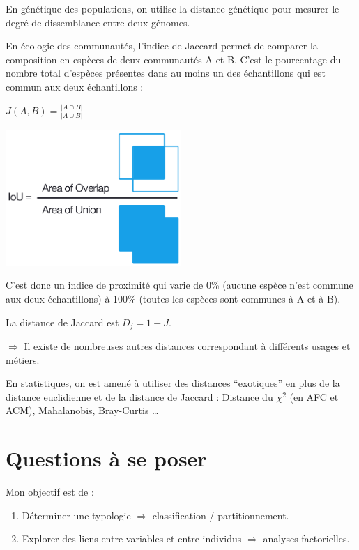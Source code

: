 \documentclass[]{book}
\providecommand{\tightlist}{%
  \setlength{\itemsep}{0pt}\setlength{\parskip}{0pt}}
\begin{document}
En génétique des populations, on utilise la distance génétique pour mesurer le degré de dissemblance entre deux génomes.

En écologie des communautés, l'indice de Jaccard permet de comparer la composition en espèces de deux communautés A et B. C'est le pourcentage du nombre total d'espèces présentes dans au moins un des échantillons qui est commun aux deux échantillons :

\(J(A,B) = \frac{|A \cap B|}{|A \cup B|}\)

\includegraphics[width=0.5\textwidth,height=\textheight]{images/jaccard.png}

C'est donc un indice de proximité qui varie de 0\% (aucune espèce n'est commune aux deux échantillons) à 100\% (toutes les espèces sont communes à A et à B).

La distance de Jaccard est \(D_j = 1 - J\).

\(\Rightarrow\) Il existe de nombreuses autres distances correspondant à différents usages et métiers.

En statistiques, on est amené à utiliser des distances ``exotiques'' en plus de la distance euclidienne et de la distance de Jaccard : Distance du \({\chi}^2\) (en AFC et ACM), Mahalanobis, Bray-Curtis \ldots{}

\hypertarget{questions-a-se-poser}{%
\section{Questions à se poser}\label{questions-a-se-poser}}

Mon objectif est de :

\begin{enumerate}
\def\labelenumi{\arabic{enumi}.}
\tightlist
\item
  Déterminer une typologie \(\Rightarrow\) classification / partitionnement.
\item
  Explorer des liens entre variables et entre individus \(\Rightarrow\) analyses factorielles.
\end{enumerate}
\end{document}
